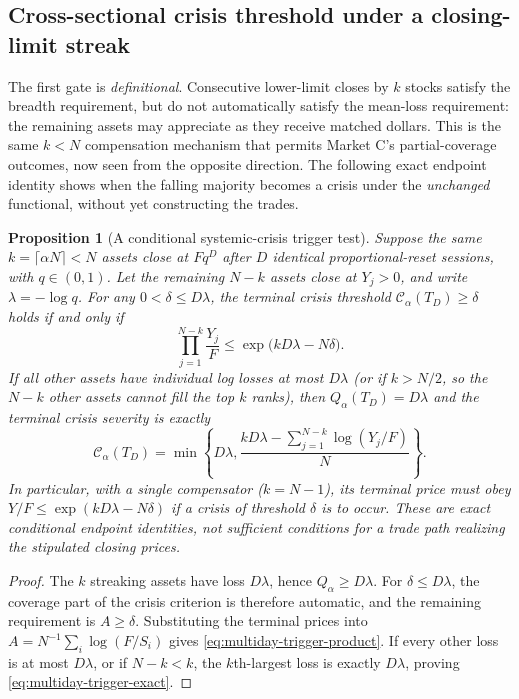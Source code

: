 \documentclass[11pt]{article}
\numberwithin{equation}{section}
\newtheorem{proposition}[theorem]{Proposition}
\theoremstyle{definition}
\theoremstyle{remark}
\newcommand{\Cris}{\mathcal{C}}
\begin{document}
\subsection{Cross-sectional crisis threshold under a closing-limit streak}\label{subsec:multiday-breadth}
The first gate is \emph{definitional}. Consecutive lower-limit closes by $k$ stocks satisfy the breadth requirement, but do not automatically satisfy the mean-loss requirement: the remaining assets may appreciate as they receive matched dollars. This is the same $k<N$ compensation mechanism that permits Market C's partial-coverage outcomes, now seen from the opposite direction. The following exact endpoint identity shows when the falling majority becomes a crisis under the \emph{unchanged} functional, without yet constructing the trades.
\begin{proposition}[A conditional systemic-crisis trigger test]\label{prop:multiday-crisis-trigger}
Suppose the same $k=\lceil\alpha N\rceil<N$ assets close at $Fq^D$ after $D$ identical proportional-reset sessions, with $q\in(0,1)$. Let the remaining $N-k$ assets close at $Y_j>0$, and write $\lambda=-\log q$. For any $0<\delta\le D\lambda$, the \emph{terminal} crisis threshold $\Cris_\alpha(T_D)\ge\delta$ holds if and only if
\begin{equation}\label{eq:multiday-trigger-product}
\boxed{\qquad \prod_{j=1}^{N-k}\frac{Y_j}{F}
 \le\exp\bigl(kD\lambda-N\delta\bigr).\qquad}
\end{equation}
If all other assets have individual log losses at most $D\lambda$ (or if $k>N/2$, so the $N-k$ other assets cannot fill the top $k$ ranks), then $Q_\alpha(T_D)=D\lambda$ and the terminal crisis severity is exactly
\begin{equation}\label{eq:multiday-trigger-exact}
\boxed{\quad\Cris_\alpha(T_D)=\min\!\left\{D\lambda,
 \frac{kD\lambda-\sum_{j=1}^{N-k}\log(Y_j/F)}{N}\right\}.\quad}
\end{equation}
In particular, with a single compensator ($k=N-1$), its terminal price must obey $Y/F\le\exp(kD\lambda-N\delta)$ if a crisis of threshold $\delta$ is to occur. These are exact \emph{conditional endpoint identities}, not sufficient conditions for a trade path realizing the stipulated closing prices.
\end{proposition}
\begin{proof}
The $k$ streaking assets have loss $D\lambda$, hence $Q_\alpha\ge D\lambda$. For $\delta\le D\lambda$, the coverage part of the crisis criterion is therefore automatic, and the remaining requirement is $A\ge\delta$. Substituting the terminal prices into $A=N^{-1}\sum_i\log(F/S_i)$ gives \eqref{eq:multiday-trigger-product}. If every other loss is at most $D\lambda$, or if $N-k<k$, the $k$th-largest loss is exactly $D\lambda$, proving \eqref{eq:multiday-trigger-exact}.
\end{proof}
\end{document}
